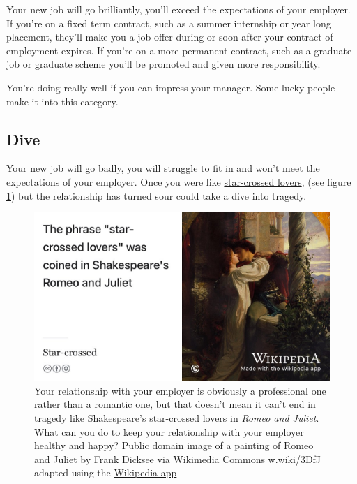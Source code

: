 \documentclass[
]{book}
\begin{document}
Your new job will go brilliantly, you'll exceed the expectations of your employer. If you're on a fixed term contract, such as a summer internship or year long placement, they'll make you a job offer during or soon after your contract of employment expires. If you're on a more permanent contract, such as a graduate job or graduate scheme you'll be promoted and given more responsibility. 💪

You're doing really well if you can impress your manager. Some lucky people make it into this category.

\hypertarget{dive}{%
\subsection{Dive}\label{dive}}

Your new job will go badly, you will struggle to fit in and won't meet the expectations of your employer. Once you were like \href{https://en.wikipedia.org/wiki/Star-crossed}{star-crossed lovers}, (see figure \ref{fig:romeo-fig}) but the relationship has turned sour could take a dive into tragedy. \citep{romeo, goblewroe}

\begin{figure}

{\centering \includegraphics[width=1\linewidth]{images/star-crossed-lovers} 

}

\caption{Your relationship with your employer is obviously a professional one rather than a romantic one, but that doesn't mean it can't end in tragedy like Shakespeare's \href{https://en.wikipedia.org/wiki/Star-crossed}{star-crossed} lovers in \emph{Romeo and Juliet}. \citep{romeo} What can you do to keep your relationship with your employer healthy and happy? Public domain image of a painting of Romeo and Juliet by Frank Dicksee via Wikimedia Commons \href{https://w.wiki/3DfJ}{w.wiki/3DfJ} adapted using the \href{https://apps.apple.com/gb/app/wikipedia/id324715238}{Wikipedia app}}\label{fig:romeo-fig}
\end{figure}
\end{document}
